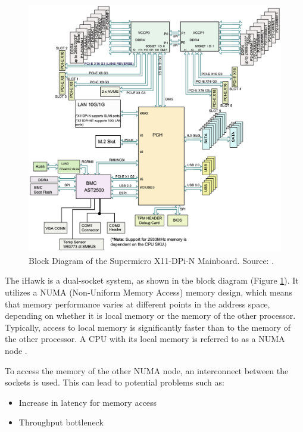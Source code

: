 \begin{figure}[ht!]
    \centering
    \includegraphics[width=1\linewidth]{figures/method/image1.png}
    \caption[Block Diagram of the Supermicro X11-DPi-N Mainboard]{Block Diagram of the Supermicro X11-DPi-N Mainboard. Source: \cite{setup05}.}
    \label{fig:BlockDiagrIHawk}
\end{figure}

The iHawk is a dual-socket system, as shown in the block diagram (Figure \ref{fig:BlockDiagrIHawk}). It utilizes a NUMA (Non-Uniform Memory Access) memory design, which means that memory performance varies at different points in the address space, depending on whether it is local memory or the memory of the other processor. Typically, access to local memory is significantly faster than to the memory of the other processor. A CPU with its local memory is referred to as a NUMA node \cite{setup06}.

To access the memory of the other NUMA node, an interconnect between the sockets is used. This can lead to potential problems such as:

\begin{itemize}
\item Increase in latency for memory access
\item Throughput bottleneck
\end{itemize}

